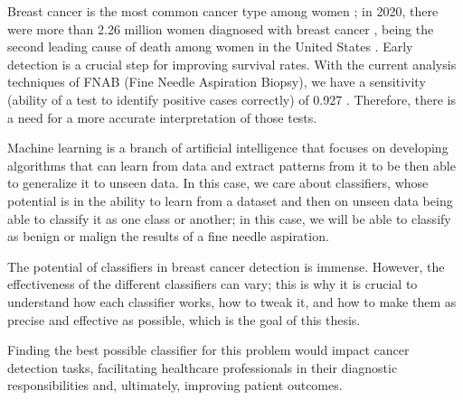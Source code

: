 Breast cancer is the most common cancer type among women \cite{wcrf_international_breast_nodate}; in 2020, there were more than 2.26 million women diagnosed with breast cancer \cite{wcrf_international_breast_nodate}, being the second leading cause of death among women in the United States \cite{american_cancer_society_breast_nodate}. Early detection is a crucial step for improving survival rates. With the current analysis techniques of 
FNAB (Fine Needle Aspiration Biopsy), 
we have a sensitivity (ability of a test to identify positive cases correctly) of 0.927 \cite{yu_diagnostic_2012}. Therefore, there is a need for a more accurate interpretation of those tests.

Machine learning is a branch of artificial intelligence that focuses on developing algorithms that can learn from data and extract patterns from it to be then able to generalize it to unseen data. In this case, we care about classifiers, whose potential is in the ability to learn from a dataset and then on unseen data being able to classify it as one class or another; in this case, we will be able to classify as benign or malign the results of a fine needle aspiration.

The potential of classifiers in breast cancer detection is immense. However, the effectiveness of the different classifiers can vary; this is why it is crucial to understand how each classifier works, how to tweak it, and how to make them as precise and effective as possible, which is the goal of this thesis.

Finding the best possible classifier for this problem would impact cancer detection tasks, facilitating healthcare professionals in their diagnostic responsibilities and, ultimately, improving patient outcomes.